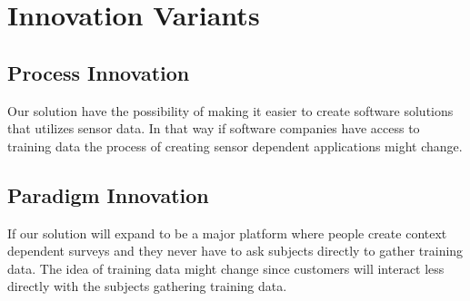 
\section{Innovation Variants}
\label{sec:innovation_variants}


\subsection{Process Innovation}
\label{sub:process_innovation}

Our solution have the possibility of making it easier to create software solutions that utilizes sensor data. In that way if software companies have access to training data the process of creating sensor dependent applications might change.

\subsection{Paradigm Innovation}
\label{sub:paradigm_innovation}

If our solution will expand to be a major platform where people create context dependent surveys and they never have to ask subjects directly to gather training data. The idea of training data might change since customers will interact less directly with the subjects gathering training data.
